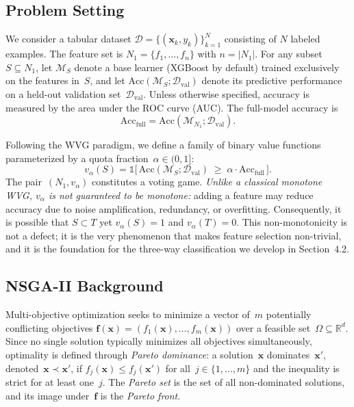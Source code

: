 \documentclass{article} %
\begin{document}
\subsection{Problem Setting}

We consider a tabular dataset $\mathcal{D} = \{(\mathbf{x}_k, y_k)\}_{k=1}^{N}$ consisting of $N$ labeled examples. The feature set is $N_1 = \{f_1, \dots, f_n\}$ with $n = |N_1|$. For any subset~$S \subseteq N_1$, let $\mathcal{M}_S$ denote a base learner (XGBoost by default) trained exclusively on the features in~$S$, and let $\text{Acc}(\mathcal{M}_S; \mathcal{D}_{\text{val}})$ denote its predictive performance on a held-out validation set~$\mathcal{D}_{\text{val}}$. Unless otherwise specified, accuracy is measured by the area under the ROC curve (AUC). The full-model accuracy is
\begin{equation}
\text{Acc}_{\text{full}} = \text{Acc}(\mathcal{M}_{N_1}; \mathcal{D}_{\text{val}}).
\label{eq:accfull}
\end{equation}

Following the WVG paradigm, we define a family of binary value functions parameterized by a quota fraction~$\alpha \in (0, 1]$:
\begin{equation}
v_\alpha(S) = \mathbb{1}\!\bigl[\,\text{Acc}(\mathcal{M}_S; \mathcal{D}_{\text{val}}) \;\geq\; \alpha \cdot \text{Acc}_{\text{full}}\,\bigr].
\label{eq:valpha}
\end{equation}
The pair~$(N_1, v_\alpha)$ constitutes a voting game. {\em Unlike a classical monotone WVG, $v_\alpha$ is not guaranteed to be monotone:} adding a feature may reduce accuracy due to noise amplification, redundancy, or overfitting. Consequently, it is possible that $S \subset T$ yet $v_\alpha(S) = 1$ and $v_\alpha(T) = 0$. This non-monotonicity is not a defect; it is the very phenomenon that makes feature selection non-trivial, and it is the foundation for the three-way classification we develop in Section~4.2.

\subsection{NSGA-II Background}

Multi-objective optimization seeks to minimize a vector of~$m$ potentially conflicting objectives $\mathbf{f}(\mathbf{x}) = (f_1(\mathbf{x}), \dots, f_m(\mathbf{x}))$ over a feasible set~$\Omega \subseteq \mathbb{R}^d$. Since no single solution typically minimizes all objectives simultaneously, optimality is defined through {\em Pareto dominance}: a solution~$\mathbf{x}$ dominates~$\mathbf{x}'$, denoted~$\mathbf{x} \prec \mathbf{x}'$, if $f_j(\mathbf{x}) \leq f_j(\mathbf{x}')$ for all~$j \in \{1,\dots,m\}$ and the inequality is strict for at least one~$j$. The {\em Pareto set} is the set of all non-dominated solutions, and its image under~$\mathbf{f}$ is the {\em Pareto front}.
\end{document}
